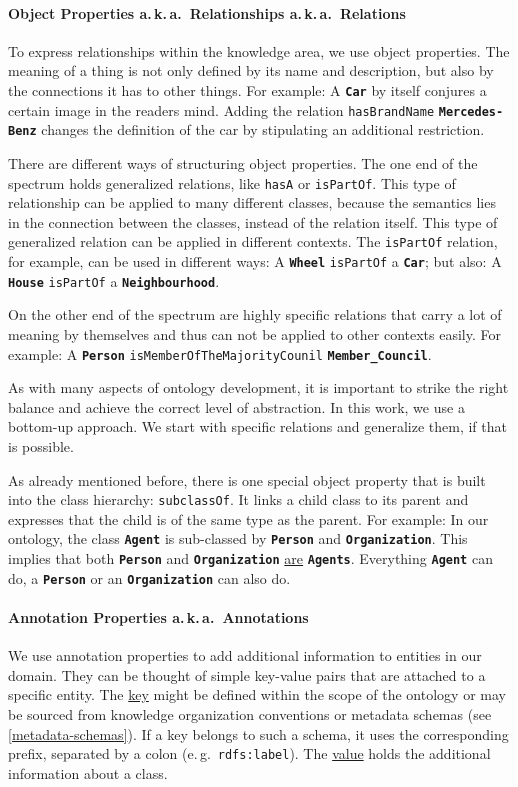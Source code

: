 \documentclass[a4paper, DIV=13, BCOR=0cm]{scrbook}
\newcommand{\eg}{e.\,g.\ }
\newcommand{\aka}{a.\,k.\,a.\ }
\newcommand{\class}[1]{\texttt{\textbf{#1}}}
\newcommand{\relation}[1]{\texttt{#1}}
\newcommand{\prop}[1]{\texttt{#1}}
\begin{document}
\paragraph{Object Properties \aka Relationships \aka Relations}
\label{relations}
To express relationships within the knowledge area, we use object properties. The meaning of a thing is not only defined by its name and description, but also by the connections it has to other things. For example: A \class{Car} by itself conjures a certain image in the readers mind. Adding the relation \relation{hasBrandName} \class{Mercedes-Benz} changes the definition of the car by stipulating an additional restriction.

There are different ways of structuring object properties. The one end of the spectrum holds generalized relations, like \relation{hasA} or \relation{isPartOf}. This type of relationship can be applied to many different classes, because the semantics lies in the connection between the classes, instead of the relation itself. This type of generalized relation can be applied in different contexts. The \relation{isPartOf} relation, for example, can be used in different ways: A \class{Wheel} \relation{isPartOf} a \class{Car}; but also: A \class{House} \relation{isPartOf} a \class{Neighbourhood}.

On the other end of the spectrum are highly specific relations that carry a lot of meaning by themselves and thus can not be applied to other contexts easily. For example: A \class{Person} \relation{isMemberOfTheMajorityCounil} \class{Member\_Council}.

As with many aspects of ontology development, it is important to strike the right balance and achieve the correct level of abstraction. In this work, we use a bottom-up approach. We start with specific relations and generalize them, if that is possible.

As already mentioned before, there is one special object property that is built into the class hierarchy: \relation{subclassOf}. It links a child class to its parent and expresses that the child is of the same type as the parent. For example: In our ontology, the class \class{Agent} is sub-classed by \class{Person} and \class{Organization}. This implies that both \class{Person} and \class{Organization} \underline{are} \class{Agents}. Everything \class{Agent} can do, a \class{Person} or an \class{Organization} can also do.

\paragraph{Annotation Properties \aka Annotations}
\label{annotation-properties}
We use annotation properties to add additional information to entities in our domain. They can be thought of simple key-value pairs that are attached to a specific entity. The \underline{key} might be defined within the scope of the ontology or may be sourced from knowledge organization conventions or metadata schemas (see \autoref{metadata-schemas}). If a key belongs to such a schema, it uses the corresponding prefix, separated by a colon (\eg \prop{rdfs:label}). The \underline{value} holds the additional information about a class.
\end{document}
